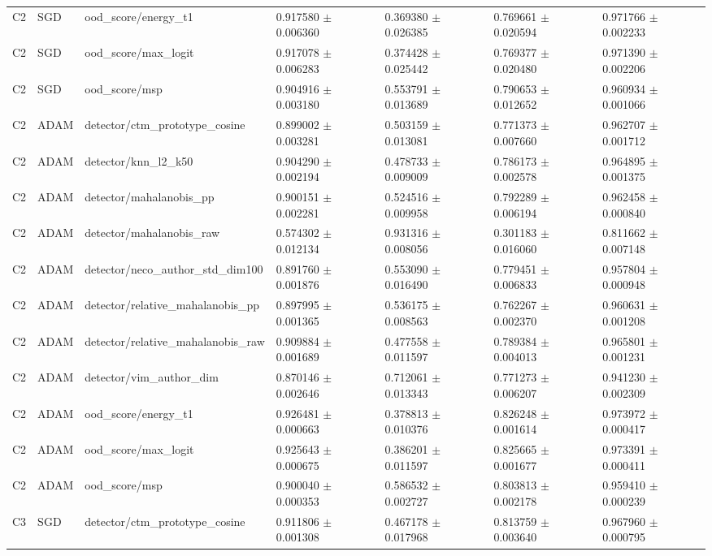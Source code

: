 \begin{longtable}{lllllll}
C2 & SGD & ood\_score/energy\_t1 & 0.917580 $\pm$ 0.006360 & 0.369380 $\pm$ 0.026385 & 0.769661 $\pm$ 0.020594 & 0.971766 $\pm$ 0.002233 \\
C2 & SGD & ood\_score/max\_logit & 0.917078 $\pm$ 0.006283 & 0.374428 $\pm$ 0.025442 & 0.769377 $\pm$ 0.020480 & 0.971390 $\pm$ 0.002206 \\
C2 & SGD & ood\_score/msp & 0.904916 $\pm$ 0.003180 & 0.553791 $\pm$ 0.013689 & 0.790653 $\pm$ 0.012652 & 0.960934 $\pm$ 0.001066 \\
C2 & ADAM & detector/ctm\_prototype\_cosine & 0.899002 $\pm$ 0.003281 & 0.503159 $\pm$ 0.013081 & 0.771373 $\pm$ 0.007660 & 0.962707 $\pm$ 0.001712 \\
C2 & ADAM & detector/knn\_l2\_k50 & 0.904290 $\pm$ 0.002194 & 0.478733 $\pm$ 0.009009 & 0.786173 $\pm$ 0.002578 & 0.964895 $\pm$ 0.001375 \\
C2 & ADAM & detector/mahalanobis\_pp & 0.900151 $\pm$ 0.002281 & 0.524516 $\pm$ 0.009958 & 0.792289 $\pm$ 0.006194 & 0.962458 $\pm$ 0.000840 \\
C2 & ADAM & detector/mahalanobis\_raw & 0.574302 $\pm$ 0.012134 & 0.931316 $\pm$ 0.008056 & 0.301183 $\pm$ 0.016060 & 0.811662 $\pm$ 0.007148 \\
C2 & ADAM & detector/neco\_author\_std\_dim100 & 0.891760 $\pm$ 0.001876 & 0.553090 $\pm$ 0.016490 & 0.779451 $\pm$ 0.006833 & 0.957804 $\pm$ 0.000948 \\
C2 & ADAM & detector/relative\_mahalanobis\_pp & 0.897995 $\pm$ 0.001365 & 0.536175 $\pm$ 0.008563 & 0.762267 $\pm$ 0.002370 & 0.960631 $\pm$ 0.001208 \\
C2 & ADAM & detector/relative\_mahalanobis\_raw & 0.909884 $\pm$ 0.001689 & 0.477558 $\pm$ 0.011597 & 0.789384 $\pm$ 0.004013 & 0.965801 $\pm$ 0.001231 \\
C2 & ADAM & detector/vim\_author\_dim & 0.870146 $\pm$ 0.002646 & 0.712061 $\pm$ 0.013343 & 0.771273 $\pm$ 0.006207 & 0.941230 $\pm$ 0.002309 \\
C2 & ADAM & ood\_score/energy\_t1 & 0.926481 $\pm$ 0.000663 & 0.378813 $\pm$ 0.010376 & 0.826248 $\pm$ 0.001614 & 0.973972 $\pm$ 0.000417 \\
C2 & ADAM & ood\_score/max\_logit & 0.925643 $\pm$ 0.000675 & 0.386201 $\pm$ 0.011597 & 0.825665 $\pm$ 0.001677 & 0.973391 $\pm$ 0.000411 \\
C2 & ADAM & ood\_score/msp & 0.900040 $\pm$ 0.000353 & 0.586532 $\pm$ 0.002727 & 0.803813 $\pm$ 0.002178 & 0.959410 $\pm$ 0.000239 \\
C3 & SGD & detector/ctm\_prototype\_cosine & 0.911806 $\pm$ 0.001308 & 0.467178 $\pm$ 0.017968 & 0.813759 $\pm$ 0.003640 & 0.967960 $\pm$ 0.000795 \\

\end{longtable}
